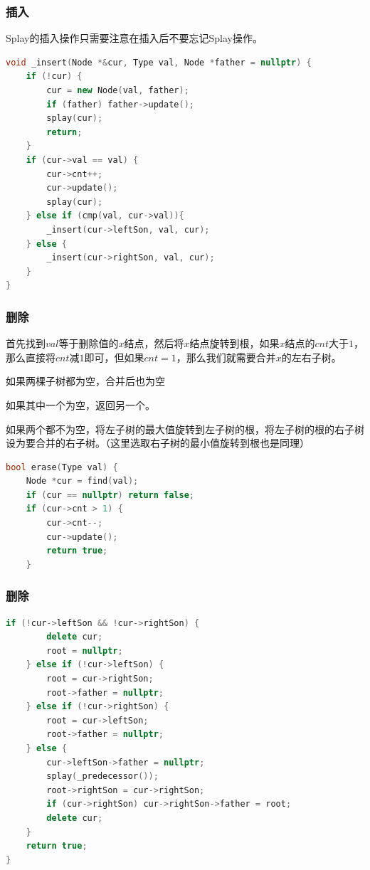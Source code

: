 \documentclass[utf8]{ctexbeamer}
\begin{document}
    \begin{frame}[fragile]
        \frametitle{插入}
        Splay的插入操作只需要注意在插入后不要忘记Splay操作。
        \begin{lstlisting}[language=c++]
void _insert(Node *&cur, Type val, Node *father = nullptr) {
    if (!cur) {
        cur = new Node(val, father);
        if (father) father->update();
        splay(cur);
        return;
    }
    if (cur->val == val) {
        cur->cnt++;
        cur->update();
        splay(cur);
    } else if (cmp(val, cur->val)){
        _insert(cur->leftSon, val, cur);
    } else {
        _insert(cur->rightSon, val, cur);
    }
}
        \end{lstlisting}
    \end{frame}

    \begin{frame}[fragile]
        \frametitle{删除}

        首先找到$val$等于删除值的$x$结点，然后将$x$结点旋转到根，如果$x$结点的$cnt$大于$1$，那么直接将$cnt$减$1$即可，但如果$cnt=1$，那么我们就需要合并$x$的左右子树。
        \begin{tcolorbox}[colframe=blue,title=合并子树]
            如果两棵子树都为空，合并后也为空

            如果其中一个为空，返回另一个。

            如果两个都不为空，将左子树的最大值旋转到左子树的根，将左子树的根的右子树设为要合并的右子树。（这里选取右子树的最小值旋转到根也是同理）
        \end{tcolorbox}
        \begin{lstlisting}[language=c++]
bool erase(Type val) {
    Node *cur = find(val);
    if (cur == nullptr) return false;
    if (cur->cnt > 1) {
        cur->cnt--;
        cur->update();
        return true;
    }
        \end{lstlisting}
    \end{frame}

    \begin{frame}[fragile]
        \frametitle{删除}
        \begin{lstlisting}[language=c++]            
    if (!cur->leftSon && !cur->rightSon) {
        delete cur;
        root = nullptr;
    } else if (!cur->leftSon) {
        root = cur->rightSon;
        root->father = nullptr;
    } else if (!cur->rightSon) {
        root = cur->leftSon;
        root->father = nullptr;
    } else {
        cur->leftSon->father = nullptr;
        splay(_predecessor());
        root->rightSon = cur->rightSon;
        if (cur->rightSon) cur->rightSon->father = root;
        delete cur;
    }
    return true;
}
        \end{lstlisting}    
    \end{frame}
\end{document}
